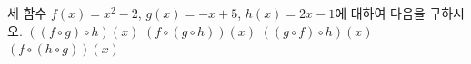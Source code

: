 세 함수 $f(x)=x^2-2$, $g(x)=-x+5$, $h(x)=2x-1$에 대하여 다음을 구하시오.
 $((f\circ g)\circ h)(x)$
 $(f\circ(g\circ h))(x)$
 $((g\circ f)\circ h)(x)$
 $(f\circ(h\circ g))(x)$
